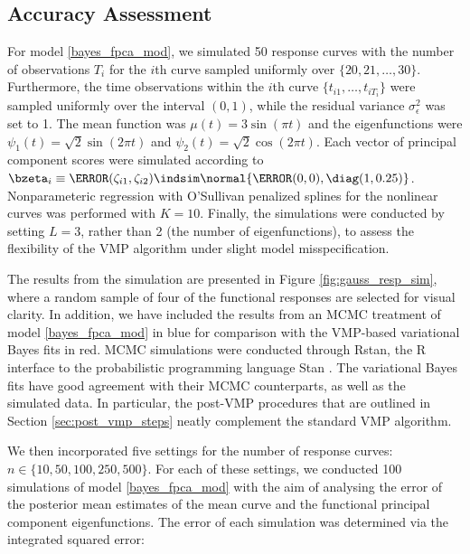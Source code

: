 \documentclass[ba]{imsart}
\numberwithin{equation}{section}
\theoremstyle{plain}
\def\sigsqeps{\sigma^2_{\epsilon}}
\begin{document}

\subsection{Accuracy Assessment}
\label{sec:acc_ass}

For model \eqref{bayes_fpca_mod}, we simulated 50 response curves with the number
of observations $T_i$ for the $i$th curve sampled uniformly over $\{ 20, 21, \dots, 30 \}$. Furthermore, the time
observations within the $i$th curve $\{ t_{i1}, \dots, t_{i T_i} \}$ were sampled uniformly over the interval $(0, 1)$,
while the residual variance $\sigsqeps$ was set to 1. The mean function was $\mu (t) = 3 \sin (\pi t)$
and the eigenfunctions were $\psi_1 (t) = \sqrt{2} \sin (2 \pi t)$ and $\psi_2 (t) = \sqrt{2} \cos (2 \pi t)$.
Each vector of principal component scores were simulated according to
$\bzeta_i \equiv \T{(\zeta_{i1}, \zeta_{i2})} \indsim \normal \{ \T{(0, 0)}, \diag(1, 0.25) \}$.
Nonparameteric regression with O'Sullivan penalized splines for the nonlinear curves was performed
with $K = 10$. Finally, the simulations were conducted by setting $L = 3$, rather
than 2 (the number of eigenfunctions), to assess the flexibility of the VMP algorithm under slight model misspecification.

The results from the simulation are presented in Figure \ref{fig:gauss_resp_sim}, where a random sample of
four of the functional responses are selected for visual clarity. In addition, we have included the results from an MCMC
treatment of model \eqref{bayes_fpca_mod} in blue for comparison with
the VMP-based variational Bayes fits in red.
MCMC simulations were conducted through \textsf{Rstan}, the \textsf{R} \citep{r20} interface to the probabilistic
programming language \textsf{Stan} \citep{rstan20}.
The variational Bayes fits have good agreement with their MCMC
counterparts, as well as the simulated data.
In particular, the post-VMP procedures that are outlined in Section \ref{sec:post_vmp_steps} neatly
complement the standard VMP algorithm.

We then incorporated five settings for the number of response curves: $n \in \{ 10, 50, 100, \allowbreak
250, 500 \}$. For each of these
settings, we conducted 100 simulations of model \eqref{bayes_fpca_mod} with the aim of analysing the error of
the posterior mean estimates of the mean curve and the functional principal
component eigenfunctions. The error of each simulation was determined via the
integrated squared error:
\end{document}
